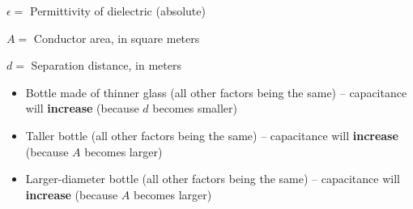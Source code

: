 $\epsilon =$ Permittivity of dielectric (absolute)

$A =$ Conductor area, in square meters

$d =$ Separation distance, in meters

\vskip 10pt

\begin{itemize}
\item{} Bottle made of thinner glass (all other factors being the same) -- capacitance will {\bf increase} (because $d$ becomes smaller)
\item{} Taller bottle (all other factors being the same) -- capacitance will {\bf increase} (because $A$ becomes larger)
\item{} Larger-diameter bottle (all other factors being the same) -- capacitance will {\bf increase} (because $A$ becomes larger)
\end{itemize}




